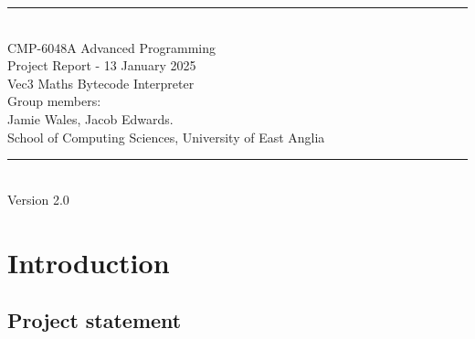 \documentclass[a4paper, oneside, 11pt]{report}
\begin{document}
\begin{titlepage}
\begin{center}
\rule{12cm}{1mm} \\
\vspace{1cm}
{\large  CMP-6048A Advanced Programming} %
\vspace{7.5cm}
\\{\Large Project Report - 13 January 2025}
\vspace{1.5cm}
\\{\LARGE Vec3 Maths Bytecode Interpreter} %
\vspace{1.0cm}
\\{\Large Group members: \\ Jamie Wales, Jacob Edwards.\ }
\vspace{10.0cm}
\\{\large School of Computing Sciences, University of East Anglia}
\\ \rule{12cm}{0.5mm}
\\ \hspace{8.5cm} {\large Version 2.0}
\end{center}
\end{titlepage}


\setcounter{page}{1}

\begin{abstract}
Vec3 is a bytecode interpreted maths language complete with a GUI, plotting, full static type inference and various 
maths functions.

The language is designed to be simple to use and understand, with a focus on strict mathematical expressions and 
plotting, but with more powerful constructs such as recursive bindings, first class functions and static type inference.

The language and GUI are written in F\#, using Avalonia\citep{avalonia} for the GUI and ScottPlot\citep{scottPlot} for plotting.
\end{abstract}

\chapter{Introduction}\label{ch:intro}

\section{Project statement}\label{sec:project-statement}
\end{document}
